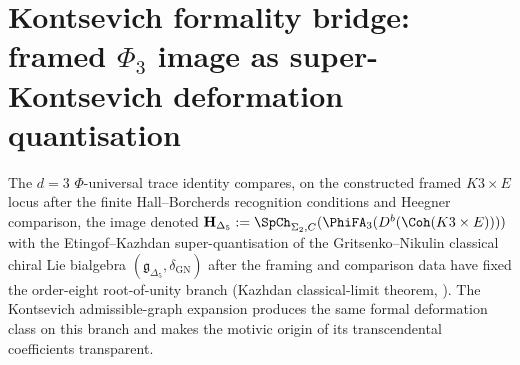 \section{Kontsevich formality bridge: framed \texorpdfstring{$\Phi_3$}{Phi-3} image as super-Kontsevich deformation quantisation}
\label{sec:phiutp-kontsevich-formality-bridge}

The $d = 3$ $\Phi$-universal trace identity compares, on the constructed
framed $K3\times E$ locus after the finite Hall--Borcherds recognition
conditions and Heegner comparison, the image denoted
$\mathbf{H}_{\Delta_5} :=
\SpCh_{\Sigma_2,C}(\PhiFA_3(D^b(\Coh(K3\times E))))$ with the
Etingof--Kazhdan super-quantisation of the Gritsenko--Nikulin classical
chiral Lie bialgebra $(\mathfrak{g}_{\Delta_5}, \delta_{\mathrm{GN}})$
after the framing and comparison data have fixed the order-eight
root-of-unity branch (Kazhdan classical-limit theorem, \cite{VolI}).
The Kontsevich admissible-graph expansion produces the same formal
deformation class on this branch and makes the motivic origin of its
transcendental coefficients transparent.

